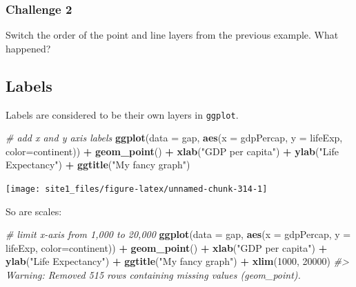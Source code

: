 \documentclass[]{book}
\newenvironment{Shaded}{\begin{snugshade}}{\end{snugshade}}
\newcommand{\KeywordTok}[1]{\textcolor[rgb]{0.13,0.29,0.53}{\textbf{#1}}}
\newcommand{\DataTypeTok}[1]{\textcolor[rgb]{0.13,0.29,0.53}{#1}}
\newcommand{\DecValTok}[1]{\textcolor[rgb]{0.00,0.00,0.81}{#1}}
\newcommand{\StringTok}[1]{\textcolor[rgb]{0.31,0.60,0.02}{#1}}
\newcommand{\CommentTok}[1]{\textcolor[rgb]{0.56,0.35,0.01}{\textit{#1}}}
\newcommand{\OperatorTok}[1]{\textcolor[rgb]{0.81,0.36,0.00}{\textbf{#1}}}
\newcommand{\NormalTok}[1]{#1}
\begin{document}
\subsubsection*{Challenge 2}\label{challenge-2-1}

Switch the order of the point and line layers from the previous example.
What happened?

\subsection{Labels}\label{labels-1}

Labels are considered to be their own layers in \texttt{ggplot}.

\begin{Shaded}
\begin{Highlighting}[]
\CommentTok{# add x and y axis labels}
\KeywordTok{ggplot}\NormalTok{(}\DataTypeTok{data =}\NormalTok{ gap, }\KeywordTok{aes}\NormalTok{(}\DataTypeTok{x =}\NormalTok{ gdpPercap, }\DataTypeTok{y =}\NormalTok{ lifeExp, }\DataTypeTok{color=}\NormalTok{continent)) }\OperatorTok{+}\StringTok{ }
\StringTok{  }\KeywordTok{geom_point}\NormalTok{() }\OperatorTok{+}\StringTok{ }
\StringTok{  }\KeywordTok{xlab}\NormalTok{(}\StringTok{"GDP per capita"}\NormalTok{) }\OperatorTok{+}\StringTok{ }
\StringTok{  }\KeywordTok{ylab}\NormalTok{(}\StringTok{"Life Expectancy"}\NormalTok{) }\OperatorTok{+}\StringTok{ }
\StringTok{  }\KeywordTok{ggtitle}\NormalTok{(}\StringTok{"My fancy graph"}\NormalTok{)}
\end{Highlighting}
\end{Shaded}

\begin{center}\texttt{[image: site1\_files/figure-latex/unnamed-chunk-314-1]} \end{center}

So are scales:

\begin{Shaded}
\begin{Highlighting}[]
\CommentTok{# limit x-axis from 1,000 to 20,000}
\KeywordTok{ggplot}\NormalTok{(}\DataTypeTok{data =}\NormalTok{ gap, }\KeywordTok{aes}\NormalTok{(}\DataTypeTok{x =}\NormalTok{ gdpPercap, }\DataTypeTok{y =}\NormalTok{ lifeExp, }\DataTypeTok{color=}\NormalTok{continent)) }\OperatorTok{+}\StringTok{ }
\StringTok{  }\KeywordTok{geom_point}\NormalTok{() }\OperatorTok{+}\StringTok{ }
\StringTok{  }\KeywordTok{xlab}\NormalTok{(}\StringTok{"GDP per capita"}\NormalTok{) }\OperatorTok{+}\StringTok{ }
\StringTok{  }\KeywordTok{ylab}\NormalTok{(}\StringTok{"Life Expectancy"}\NormalTok{) }\OperatorTok{+}\StringTok{ }
\StringTok{  }\KeywordTok{ggtitle}\NormalTok{(}\StringTok{"My fancy graph"}\NormalTok{) }\OperatorTok{+}\StringTok{ }
\StringTok{  }\KeywordTok{xlim}\NormalTok{(}\DecValTok{1000}\NormalTok{, }\DecValTok{20000}\NormalTok{)}
\CommentTok{#> Warning: Removed 515 rows containing missing values (geom_point).}
\end{Highlighting}
\end{Shaded}
\end{document}
